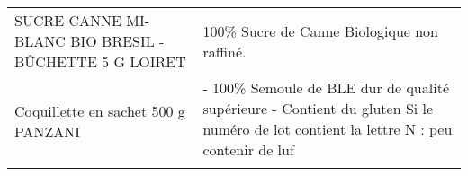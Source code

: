 \begin{longtable}{p{5cm}p{10cm}}
                                                    SUCRE CANNE MI-BLANC BIO BRESIL - BÛCHETTE 5 G LOIRET &                                                                                                                                                                                                                                                                                                                                                                                                                                                                                                                                                                                                                                                                                                                                                                                                                                                                                                                                                                                              100\% Sucre de Canne Biologique non raffiné. \\
                                                                      Coquillette en sachet 500 g PANZANI &                                                                                                                                                                                                                                                                                                                                                                                                                                                                                                                                                                                                                                                                                                                                                                                                                                                                                                  - 100\% Semoule de BLE dur de qualité supérieure  - Contient du gluten  Si le numéro de lot contient la lettre N : peu contenir de luf \\

\end{longtable}
